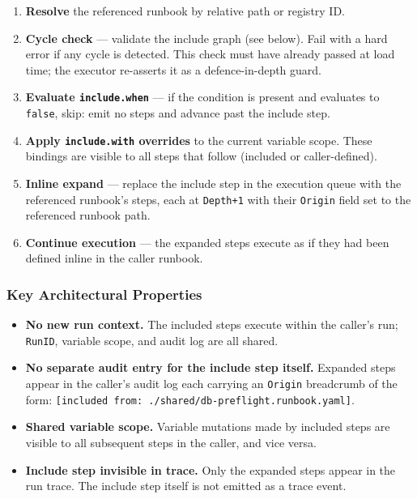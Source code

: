 \begin{enumerate}
  \item \textbf{Resolve} the referenced runbook by relative path or registry ID.
  \item \textbf{Cycle check} — validate the include graph (see below). Fail with a hard error
        if any cycle is detected. This check must have already passed at load time; the
        executor re-asserts it as a defence-in-depth guard.
  \item \textbf{Evaluate \texttt{include.when}} — if the condition is present and evaluates to
        \texttt{false}, skip: emit no steps and advance past the include step.
  \item \textbf{Apply \texttt{include.with} overrides} to the current variable scope. These
        bindings are visible to all steps that follow (included or caller-defined).
  \item \textbf{Inline expand} — replace the include step in the execution queue with the
        referenced runbook's steps, each at \texttt{Depth+1} with their \texttt{Origin} field
        set to the referenced runbook path.
  \item \textbf{Continue execution} — the expanded steps execute as if they had been defined
        inline in the caller runbook.
\end{enumerate}

\subsubsection*{Key Architectural Properties}

\begin{itemize}
  \item \textbf{No new run context.} The included steps execute within the caller's run;
        \texttt{RunID}, variable scope, and audit log are all shared.
  \item \textbf{No separate audit entry for the include step itself.} Expanded steps appear
        in the caller's audit log each carrying an \texttt{Origin} breadcrumb of the form:
        \texttt{[included from: ./shared/db-preflight.runbook.yaml]}.
  \item \textbf{Shared variable scope.} Variable mutations made by included steps are
        visible to all subsequent steps in the caller, and vice versa.
  \item \textbf{Include step invisible in trace.} Only the expanded steps appear in the run
        trace. The include step itself is not emitted as a trace event.
\end{itemize}

